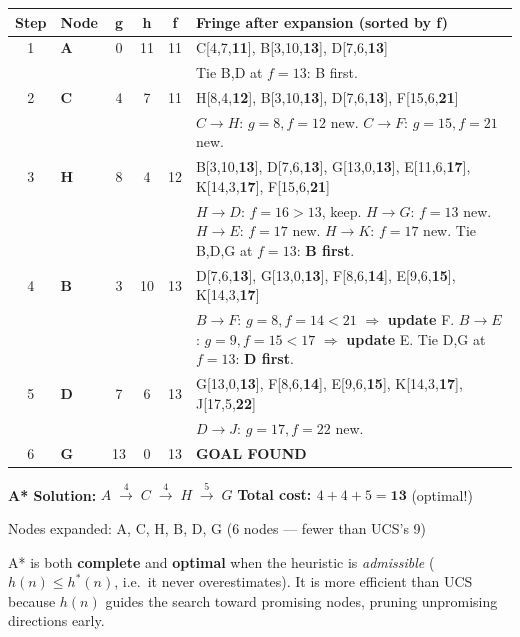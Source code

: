 \documentclass[12pt, a4paper]{article}
\newenvironment{answerbox}{\begin{mdframed}[style=answerframe]}{\end{mdframed}}
\newcommand{\goal}{\textcolor{green!55!black}{\textbf{GOAL FOUND}}}
\begin{document}
\vspace{0.4em}
\begin{center}
\renewcommand{\arraystretch}{1.3}
\small
\begin{tabular}{c|l|c|c|c|p{7.2cm}}
\toprule
\textbf{Step} & \textbf{Node} & \textbf{g} & \textbf{h} & \textbf{f} &
\textbf{Fringe after expansion (sorted by f)} \\
\midrule
1 & \textbf{A} & 0 & 11 & 11
  & C[4,7,\textbf{11}], B[3,10,\textbf{13}], D[7,6,\textbf{13}] \\
  & & & & & \footnotesize Tie B,D at $f{=}13$: B first. \\
\midrule
2 & \textbf{C} & 4 & 7 & 11
  & H[8,4,\textbf{12}], B[3,10,\textbf{13}], D[7,6,\textbf{13}], F[15,6,\textbf{21}] \\
  & & & & & \footnotesize $C{\to}H$: $g{=}8,f{=}12$ new. $C{\to}F$: $g{=}15,f{=}21$ new. \\
\midrule
3 & \textbf{H} & 8 & 4 & 12
  & B[3,10,\textbf{13}], D[7,6,\textbf{13}], G[13,0,\textbf{13}], E[11,6,\textbf{17}], K[14,3,\textbf{17}], F[15,6,\textbf{21}] \\
  & & & & & \footnotesize $H{\to}D$: $f{=}16>13$, keep. $H{\to}G$: $f{=}13$ new. $H{\to}E$: $f{=}17$ new. $H{\to}K$: $f{=}17$ new. Tie B,D,G at $f{=}13$: \textbf{B first}. \\
\midrule
4 & \textbf{B} & 3 & 10 & 13
  & D[7,6,\textbf{13}], G[13,0,\textbf{13}], F[8,6,\textbf{14}], E[9,6,\textbf{15}], K[14,3,\textbf{17}] \\
  & & & & & \footnotesize $B{\to}F$: $g{=}8,f{=}14<21$ $\Rightarrow$ \textbf{update} F. $B{\to}E$: $g{=}9,f{=}15<17$ $\Rightarrow$ \textbf{update} E. Tie D,G at $f{=}13$: \textbf{D first}. \\
\midrule
5 & \textbf{D} & 7 & 6 & 13
  & G[13,0,\textbf{13}], F[8,6,\textbf{14}], E[9,6,\textbf{15}], K[14,3,\textbf{17}], J[17,5,\textbf{22}] \\
  & & & & & \footnotesize $D{\to}J$: $g{=}17,f{=}22$ new. \\
\midrule
6 & \textbf{G} & 13 & 0 & 13
  & \goal \\
\bottomrule
\end{tabular}
\end{center}

\begin{answerbox}
\textbf{A* Solution:} $A \;\xrightarrow{4}\; C \;\xrightarrow{4}\; H \;\xrightarrow{5}\; G$
\hfill \textbf{Total cost: $4+4+5 = \mathbf{13}$} (optimal!)

Nodes expanded: A, C, H, B, D, G \quad(6 nodes — fewer than UCS's 9)

A* is both \textbf{complete} and \textbf{optimal} when the heuristic is \emph{admissible} ($h(n) \leq h^*(n)$, i.e.\ it never overestimates). It is more efficient than UCS because $h(n)$ guides the search toward promising nodes, pruning unpromising directions early.
\end{answerbox}
\end{document}
